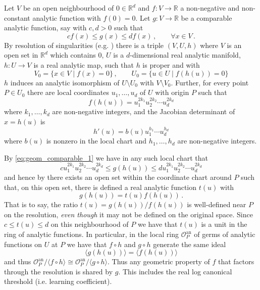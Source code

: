 \documentclass[english,letter paper,12pt,reqno]{article}
\theoremstyle{definition}
\newcommand{\lto}{\longrightarrow}
\begin{document}
Let $V$ be an open neighbourhood of $0 \in \mathbb{R}^d$ and $f: V \lto \mathbb{R}$ a non-negative and non-constant analytic function with $f(0) = 0$. Let $g: V \lto \mathbb{R}$ be a comparable analytic function, say with $c, d > 0$ such that
\begin{equation}\label{eq:geom_comparable_1}
c f(x) \le g(x) \le d f(x)\,, \qquad \forall x \in V\,.
\end{equation}
By resolution of singularities (e.g. \cite[Theorem 2.3]{watanabeAlgebraicGeometryStatistical2009}) there is a triple $(V, U, h)$ where $V$ is an open set in $\mathbb{R}^d$ which contains $0$, $U$ is a $d$-dimensional real analytic manifold, $h: U \lto V$ is a real analytic map, such that $h$ is proper and with
\[
V_0 = \{ x \in V \mid f(x) = 0 \}\,, \qquad U_0 = \{ u \in U \mid f(h(u)) = 0 \}
\]
$h$ induces an analytic isomorphism of $U \setminus U_0$ with $V \setminus V_0$. Further, for every point $P \in U_0$ there are local coordinates $u_1,\ldots,u_d$ of $U$ with origin $P$ such that
\[
f(h(u)) = u_1^{2k_1} u_2^{2k_2} \cdots u_d^{2k_d}
\]
where $k_1,\ldots,k_d$ are non-negative integers, and the Jacobian determinant of $x = h(u)$ is
\[
h'(u) = b(u) u_1^{h_1} \cdots u_d^{h_d}
\]
where $b(u)$ is nonzero in the local chart and $h_1,\ldots,h_d$ are non-negative integers.

By \eqref{eq:geom_comparable_1} we have in any such local chart that
\[
c u_1^{2k_1} u_2^{2k_2} \cdots u_d^{2k_d} \le g(h(u)) \le d u_1^{2k_1} u_2^{2k_2} \cdots u_d^{2k_d}
\]
and hence by \cite[Theorem 2.6]{watanabeAlgebraicGeometryStatistical2009} there exists an open set within the coordinate chart around $P$ such that, on this open set, there is defined a real analytic function $t(u)$ with
\[
g(h(u)) = t(u) f(h(u))\,.
\]
That is to say, the ratio $t(u) = g(h(u))/f(h(u))$ is well-defined near $P$ on the resolution, \emph{even though} it may not be defined on the original space. Since $c \le t(u) \le d$ on this neighbourhood of $P$ we have that $t(u)$ is a unit in the ring of analytic functions. In particular, in the local ring $\mathcal{O}^{\text{an}}_P$ of germs of analytic functions on $U$ at $P$ we have that $f \circ h$ and $g \circ h$ generate the same ideal
\[
\langle g(h(u)) \rangle = \langle f(h(u)) \rangle
\]
and thus $\mathcal{O}^{\text{an}}_P/\langle f \circ h \rangle \cong \mathcal{O}^{\text{an}}_P / \langle g \circ h \rangle$. Thus any geometric property of $f$ that factors through the resolution is shared by $g$. This includes the real log canonical threshold (i.e. learning coefficient).
\end{document}
